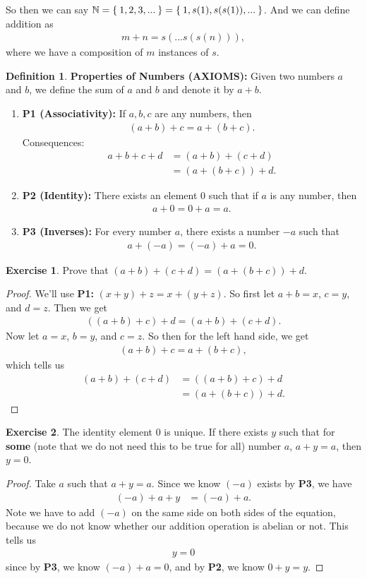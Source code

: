 \documentclass[12pt]{amsbook}
\theoremstyle{plain}
\numberwithin{section}{chapter}
\numberwithin{equation}{chapter}
\theoremstyle{definition}
\newtheorem{e}{Exercise}
\newtheorem{Def}[theorem]{Definition}
\theoremstyle{remark}
\theoremstyle{plain}
\newcommand{\n}{\mathbb{N}}
\newcommand{\bee}{\begin{equation}\begin{aligned}}
\newcommand{\eee}{\end{aligned}\end{equation}}
\begin{document}
So then we can say $\n = \Set{1,2,3,...} = \Set{1, s(1), s(s(1)),...}$. And we can define addition as
\bee
m + n = s(...s(s(n))),
\eee
where we have a composition of $m$ instances of $s$. 

\begin{Def}
\textbf{Properties of Numbers (AXIOMS): }
Given two numbers $a$ and $b$, we define the sum of $a$ and $b$ and denote it by $a + b$. 
\begin{enumerate}
\item \textbf{P1 (Associativity):} If $a,b,c$ are any numbers, then
\bee
(a + b) + c = a + (b + c). 
\eee
Consequences: 
\bee
a + b + c + d &= (a + b) + (c + d)\\
&= (a + (b + c)) + d. 
\eee

\item \textbf{P2 (Identity):} There exists an element $0$ such that if $a$ is any number, then
\bee
a + 0 = 0 + a = a. 
\eee
\item \textbf{P3 (Inverses):} For every number $a$, there exists a number $-a$ such that
\bee
a + (-a) = (-a) + a = 0.
\eee
\end{enumerate}
\end{Def}

\begin{e}
Prove that $(a + b) + (c + d) = (a + (b + c)) + d$. 
\end{e}
\begin{proof}
We'll use \textbf{P1:} $(x + y) + z = x + (y + z)$. So first let $a + b = x$, $c = y$, and $d = z$. Then we get
\bee
((a + b) + c) + d = (a + b) + (c + d).
\eee
Now let $a = x$, $b = y$, and $c = z$. So then for the left hand side, we get
\bee
(a + b) + c = a + (b + c),
\eee
which tells us
\bee
(a + b) + (c + d) &= ((a + b) + c) + d\\
&= (a + (b + c)) + d. 
\eee
\end{proof}

\begin{e}
The identity element $0$ is unique. If there exists $y$ such that for \textbf{some} (note that we do not need this to be true for all) number $a$, $a + y = a$, then $y = 0$. 
\end{e}

\begin{proof}
Take $a$ such that $a + y = a$. Since we know $(-a)$ exists by \textbf{P3}, we have
\bee
(-a) + a + y &= (-a) + a.
\eee
Note we have to add $(-a)$ on the same side on both sides of the equation, because we do not know whether our addition operation is abelian or not. This tells us
\bee
y = 0
\eee
since by \textbf{P3}, we know $(-a) + a = 0$, and by \textbf{P2}, we know $0 + y = y$. 
\end{proof}
\end{document}
